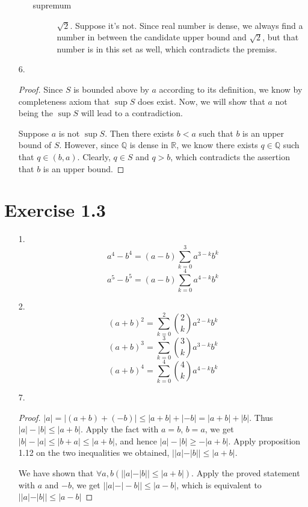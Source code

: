 \documentclass{article}
\begin{document}
\begin{itemize}
\begin{enumerate}[label=\alph*.]
\begin{description}
    \item[supremum] $\sqrt{2}$. Suppose it's not. Since real number is dense, we always find a number in between the candidate upper bound and $\sqrt{2}$, but that number is in this set as well, which contradicts the premiss.
    \end{description}
  \end{enumerate}
\item [6.]
  \begin{proof}
    Since $S$ is bounded above by $a$ according to its definition, we know by completeness axiom that $\sup S$ does exist. Now, we will show that $a$ not being the $\sup S$ will lead to a contradiction.

    Suppose $a$ is not $\sup S$. Then there exists $b < a$ such that $b$ is an upper bound of $S$. However, since $\mathbb{Q}$ is dense in $\mathbb{R}$, we know there exists $q \in \mathbb{Q}$ such that $q \in (b,a)$. Clearly, $q \in S$ and $q > b$, which contradicts the assertion that $b$ is an upper bound.
  \end{proof}
\end{itemize}

\section*{Exercise 1.3}
\begin{itemize}
\item [1.]
  \[a^4-b^4 = (a-b)\sum_{k=0}^{3}a^{3-k}b^k\]
  \[a^5-b^5 = (a-b)\sum_{k=0}^{4}a^{4-k}b^k\]
\item [2.]
  \[(a+b)^2=\sum_{k=0}^{2} {2 \choose k} a^{2-k}b^k\]
  \[(a+b)^3=\sum_{k=0}^{3} {3 \choose k} a^{3-k}b^k\]
  \[(a+b)^4=\sum_{k=0}^{4} {4 \choose k} a^{4-k}b^k\]
\item [7.]
  \begin{proof}
  $|a| = |(a+b)+(-b)| \leq  |a+b|+|-b| = |a+b|+|b|$. Thus $|a|-|b| \leq |a+b|$. Apply the fact with $a=b$, $b=a$, we get $|b|-|a| \leq |b+a| \leq |a+b|$, and hence $|a|-|b| \geq -|a+b|$. Apply proposition 1.12 on the two inequalities we obtained, $||a|-|b|| \leq |a+b|$.

  We have shown that $\forall a,b (||a|-|b|| \leq |a+b|)$. Apply the proved statement with $a$ and $-b$, we get $||a|-|-b|| \leq |a-b|$, which is equivalent to $||a|-|b|| \leq |a-b|$
\end{proof}

\end{itemize}
\end{document}
